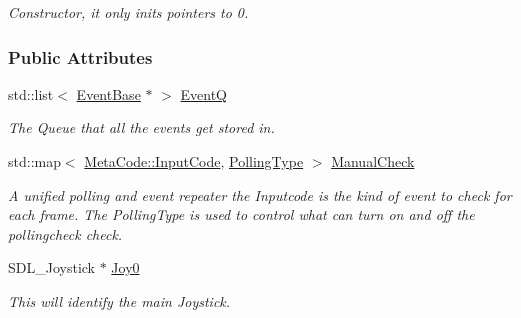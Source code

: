 \begin{DoxyCompactItemize}
\begin{DoxyCompactList}\small\item\em Constructor, it only inits pointers to 0. \item\end{DoxyCompactList}\end{DoxyCompactItemize}
\subsubsection*{Public Attributes}
\begin{DoxyCompactItemize}
\item 
\hypertarget{structphys_1_1internal_1_1EventManagerInternalData_a2a3389f3831cae8ded6dd0a3b6395a68}{
std::list$<$ \hyperlink{classphys_1_1EventBase}{EventBase} $\ast$ $>$ \hyperlink{structphys_1_1internal_1_1EventManagerInternalData_a2a3389f3831cae8ded6dd0a3b6395a68}{EventQ}}
\label{d6/d3a/structphys_1_1internal_1_1EventManagerInternalData_a2a3389f3831cae8ded6dd0a3b6395a68}

\begin{DoxyCompactList}\small\item\em The Queue that all the events get stored in. \item\end{DoxyCompactList}\item 
\hypertarget{structphys_1_1internal_1_1EventManagerInternalData_a717396b1782d7f491e0f085643507639}{
std::map$<$ \hyperlink{classphys_1_1MetaCode_a3e501cbb5bf0f6f1fdb7211465bda8d8}{MetaCode::InputCode}, \hyperlink{structphys_1_1internal_1_1EventManagerInternalData_ab9ab8380b84448aacf46a63050e159af}{PollingType} $>$ \hyperlink{structphys_1_1internal_1_1EventManagerInternalData_a717396b1782d7f491e0f085643507639}{ManualCheck}}
\label{d6/d3a/structphys_1_1internal_1_1EventManagerInternalData_a717396b1782d7f491e0f085643507639}

\begin{DoxyCompactList}\small\item\em A unified polling and event repeater the Inputcode is the kind of event to check for each frame. The PollingType is used to control what can turn on and off the pollingcheck check. \item\end{DoxyCompactList}\item 
\hypertarget{structphys_1_1internal_1_1EventManagerInternalData_aafd32b9b23cb2121bd268e3c56a3f46e}{
SDL\_\-Joystick $\ast$ \hyperlink{structphys_1_1internal_1_1EventManagerInternalData_aafd32b9b23cb2121bd268e3c56a3f46e}{Joy0}}
\label{d6/d3a/structphys_1_1internal_1_1EventManagerInternalData_aafd32b9b23cb2121bd268e3c56a3f46e}

\begin{DoxyCompactList}\small\item\em This will identify the main Joystick. \item\end{DoxyCompactList}\end{DoxyCompactItemize}


